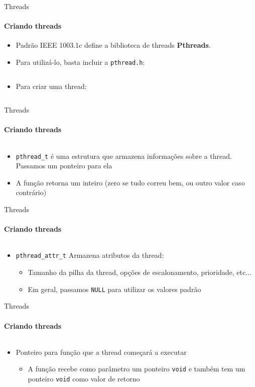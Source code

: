 \documentclass{beamer}
\begin{document}
\begin{frame}{Threads}
	\framesubtitle{Criando threads}
	\begin{itemize}
		\item Padrão IEEE 1003.1c define a biblioteca de threads \textbf{Pthreads}.
		\item Para utilizá-lo, basta incluir a \texttt{pthread.h}:
		\inputminted{c}{resources/includepthreads.c}
		\item Para criar uma thread:
		\inputminted{c}{resources/pthreadcreate.c}
	\end{itemize}
\end{frame}
\begin{frame}{Threads}
	\framesubtitle{Criando threads}
	\inputminted[highlightlines=1]{c}{resources/pthreadcreate.c}
	\begin{itemize}
		\item \texttt{pthread\_t} é uma estrutura que armazena informações sobre a thread. Passamos um ponteiro para ela
		\item A função retorna um inteiro (zero se tudo correu bem, ou outro valor caso contrário)
	\end{itemize}
\end{frame}
\begin{frame}{Threads}
	\framesubtitle{Criando threads}
	\inputminted[highlightlines=2]{c}{resources/pthreadcreate.c}
	\begin{itemize}
		\item \texttt{pthread\_attr\_t} Armazena atributos da thread:
		\begin{itemize}
			\item Tamanho da pilha da thread, opções de escalonamento, prioridade, etc...
			\item Em geral, passamos \texttt{NULL} para utilizar os valores padrão
		\end{itemize}
	\end{itemize}
\end{frame}
\begin{frame}{Threads}
	\framesubtitle{Criando threads}
	\inputminted[highlightlines=3]{c}{resources/pthreadcreate.c}
	\begin{itemize}
		\item Ponteiro para função que a thread começará a executar
		\begin{itemize}
			\item A função recebe como parâmetro um ponteiro \texttt{void} e também tem um ponteiro \texttt{void} como valor de retorno
		\end{itemize}
	\end{itemize}
\end{frame}
\end{document}
